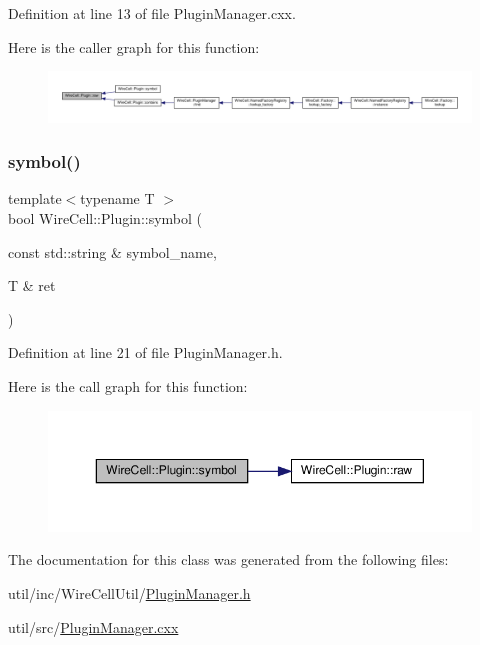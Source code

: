 Definition at line 13 of file Plugin\+Manager.\+cxx.

Here is the caller graph for this function\+:
\nopagebreak
\begin{figure}[H]
\begin{center}
\leavevmode
\includegraphics[width=350pt]{class_wire_cell_1_1_plugin_a6532d3eb05241c25780a18194cd6572f_icgraph}
\end{center}
\end{figure}
\mbox{\label{class_wire_cell_1_1_plugin_ac2e03f3242aed84a08647cd2d2e5f960}} 
\subsubsection{\texorpdfstring{symbol()}{symbol()}}
{\footnotesize\ttfamily template$<$typename T $>$ \\
bool Wire\+Cell\+::\+Plugin\+::symbol (\begin{DoxyParamCaption}\item[{const std\+::string \&}]{symbol\+\_\+name,  }\item[{T \&}]{ret }\end{DoxyParamCaption})\hspace{0.3cm}{\ttfamily [inline]}}



Definition at line 21 of file Plugin\+Manager.\+h.

Here is the call graph for this function\+:
\nopagebreak
\begin{figure}[H]
\begin{center}
\leavevmode
\includegraphics[width=350pt]{class_wire_cell_1_1_plugin_ac2e03f3242aed84a08647cd2d2e5f960_cgraph}
\end{center}
\end{figure}


The documentation for this class was generated from the following files\+:\begin{DoxyCompactItemize}
\item 
util/inc/\+Wire\+Cell\+Util/\hyperlink{_plugin_manager_8h}{Plugin\+Manager.\+h}\item 
util/src/\hyperlink{_plugin_manager_8cxx}{Plugin\+Manager.\+cxx}\end{DoxyCompactItemize}
